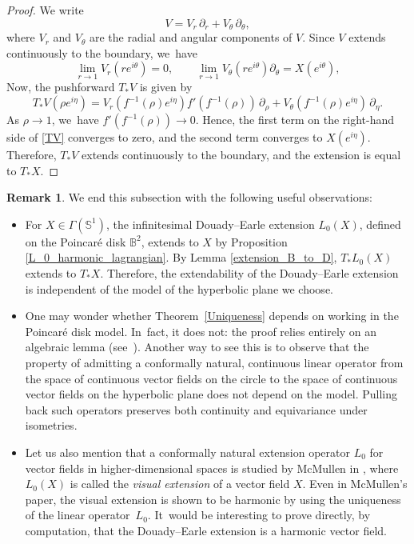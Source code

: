 \documentclass[JEP,XML,SOM,Unicode,NoEqCountersInSection, NoFloatCountersInSection,published]{cedram}
\theoremstyle{plain}
\theoremstyle{definition}
\newtheorem{remark}[cor]{Remark}
\begin{document}
\begin{proof}
We write
\[
V = V_r\, \partial_r + V_\theta\, \partial_\theta,
\]
where \(V_r\) and \(V_\theta\) are the radial and angular components of \(V\). Since \(V\) extends continuously to the boundary, we~have
\[
\lim_{r \to 1} V_r(re^{i\theta}) = 0, \qquad \lim_{r \to 1} V_\theta(re^{i\theta})\partial_{\theta} = X(e^{i\theta}),
\]
Now, the pushforward \(T_*V\) is given by
\begin{equation}\label{TV}
T_*V(\rho e^{i\eta}) = V_r(f^{-1}(\rho)e^{i\eta}) f'(f^{-1}(\rho))\, \partial_\rho + V_\theta(f^{-1}(\rho)e^{i\eta})\, \partial_\eta.
\end{equation}
As \(\rho \to 1\), we~have \(f'(f^{-1}(\rho)) \to 0\). Hence, the first term on the right-hand side of \eqref{TV} converges to zero, and the second term converges to \(X(e^{i\eta})\). Therefore, \(T_*V\) extends continuously to the boundary, and the extension is equal to \(T_*X\).
\end{proof}
\begin{remark}
We end this subsection with the following useful observations:
\begin{itemize}
\item For \(X \in \Gamma(\mathbb{S}^1)\), the infinitesimal Douady–Earle extension \(L_0(X)\), defined on the Poincaré disk \(\mathbb{B}^2\), extends to \(X\) by Proposition \ref{L_0_harmonic_lagrangian}. By Lemma \ref{extension_B_to_D}, \(T_*L_0(X)\) extends to \(T_*X\). Therefore, the extendability of the Douady–Earle extension is independent of the model of the hyperbolic plane we choose.

\item One may wonder whether Theorem~\ref{Uniqueness} depends on working in the Poincaré disk model. In~fact, it does not: the proof relies entirely on an algebraic lemma (see~\cite[\S 3]{Uniqueness_of_operator_L}). Another way to see this is to observe that the property of admitting a conformally natural, continuous linear operator from the space of continuous vector fields on the circle to the space of continuous vector fields on the hyperbolic plane does not depend on the model. Pulling back such operators preserves both continuity and equivariance under isometries.

\item Let us also mention that a conformally natural extension operator \(L_0\) for vector fields in higher-dimensional spaces is studied by McMullen in \cite[App.\,B]{mullen}, where \(L_0(X)\) is called the \emph{visual extension} of a vector field \(X\). Even in McMullen's paper, the visual extension is shown to be harmonic by using the uniqueness of the linear operator~\(L_0 \). It~would be interesting to prove directly, by computation, that the Douady–Earle extension is a harmonic vector field.
\end{itemize}
\end{remark}
\end{document}

